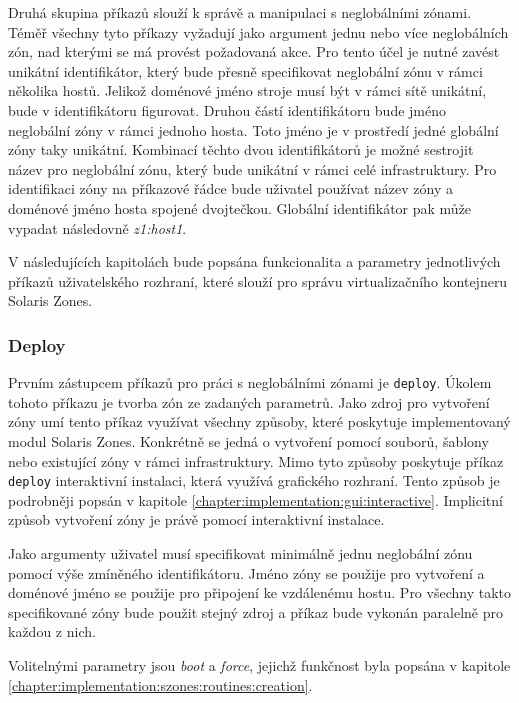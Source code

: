 Druhá skupina příkazů slouží k správě a manipulaci s neglobálními zónami. Téměř všechny tyto příkazy vyžadují jako argument jednu
nebo více neglobálních zón, nad kterými se má provést požadovaná akce. Pro tento účel je nutné zavést unikátní identifikátor,
který bude přesně specifikovat neglobální zónu v rámci několika hostů. Jelikož doménové jméno stroje musí být v rámci sítě
unikátní, bude v identifikátoru figurovat. Druhou částí identifikátoru bude jméno neglobální zóny v rámci jednoho hosta.
Toto jméno je v prostředí jedné globální zóny taky unikátní. Kombinací těchto dvou identifikátorů je možné sestrojit název
pro neglobální zónu, který bude unikátní v rámci celé infrastruktury. Pro identifikaci zóny na příkazové řádce bude uživatel
používat název zóny a doménové jméno hosta spojené dvojtečkou. Globální identifikátor pak může vypadat následovně \textit{z1:host1}.

V následujících kapitolách bude popsána funkcionalita a parametry jednotlivých příkazů uživatelského rozhraní, které slouží
pro správu virtualizačního kontejneru Solaris Zones.
\subsubsection{Deploy}
\label{chapter:implementation:client:cli:deploy}
Prvním zástupcem příkazů pro práci s neglobálními zónami je \verb|deploy|. Úkolem tohoto příkazu je tvorba zón ze zadaných parametrů.
Jako zdroj pro vytvoření zóny umí tento příkaz využívat všechny způsoby, které poskytuje implementovaný modul Solaris Zones.
Konkrétně se jedná o vytvoření pomocí souborů, šablony nebo existující zóny v rámci infrastruktury. Mimo tyto způsoby poskytuje
příkaz \verb|deploy| interaktivní instalaci, která využívá grafického rozhraní. Tento způsob je podrobněji popsán v kapitole
\ref{chapter:implementation:gui:interactive}. Implicitní způsob vytvoření zóny je právě pomocí interaktivní instalace.

Jako argumenty uživatel musí specifikovat minimálně jednu neglobální zónu pomocí výše zmíněného identifikátoru. Jméno zóny 
se použije pro vytvoření a doménové jméno se použije pro připojení ke vzdálenému hostu. Pro všechny takto specifikované zóny
bude použit stejný zdroj a příkaz bude vykonán paralelně pro každou z nich.

Volitelnými parametry jsou \textit{boot} a \textit{force}, jejichž funkčnost byla popsána v kapitole \ref{chapter:implementation:szones:routines:creation}.
